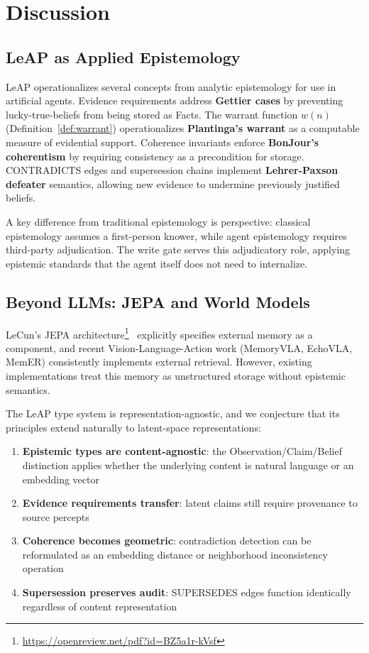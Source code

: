 \documentclass[11pt,letterpaper]{article}
\begin{document}
\section{Discussion}
\label{sec:discussion}

\subsection{LeAP as Applied Epistemology}

LeAP operationalizes several concepts from analytic epistemology for use in artificial agents. Evidence requirements address \textbf{Gettier cases} by preventing lucky-true-beliefs from being stored as Facts. The warrant function $w(n)$ (Definition~\ref{def:warrant}) operationalizes \textbf{Plantinga's warrant} as a computable measure of evidential support. Coherence invariants enforce \textbf{BonJour's coherentism} by requiring consistency as a precondition for storage. CONTRADICTS edges and supersession chains implement \textbf{Lehrer-Paxson defeater} semantics, allowing new evidence to undermine previously justified beliefs.

A key difference from traditional epistemology is perspective: classical epistemology assumes a first-person knower, while agent epistemology requires third-party adjudication. The write gate serves this adjudicatory role, applying epistemic standards that the agent itself does not need to internalize.

\subsection{Beyond LLMs: JEPA and World Models}

LeCun's JEPA architecture\footnote{\url{https://openreview.net/pdf?id=BZ5a1r-kVsf}}~\cite{lecun2022path} explicitly specifies external memory as a component, and recent Vision-Language-Action work (MemoryVLA, EchoVLA, MemER) consistently implements external retrieval. However, existing implementations treat this memory as unstructured storage without epistemic semantics.

The LeAP type system is representation-agnostic, and we conjecture that its principles extend naturally to latent-space representations:
\begin{enumerate}[noitemsep]
    \item \textbf{Epistemic types are content-agnostic}: the Observation/Claim/Belief distinction applies whether the underlying content is natural language or an embedding vector
    \item \textbf{Evidence requirements transfer}: latent claims still require provenance to source percepts
    \item \textbf{Coherence becomes geometric}: contradiction detection can be reformulated as an embedding distance or neighborhood inconsistency operation
    \item \textbf{Supersession preserves audit}: SUPERSEDES edges function identically regardless of content representation
\end{enumerate}
\end{document}
